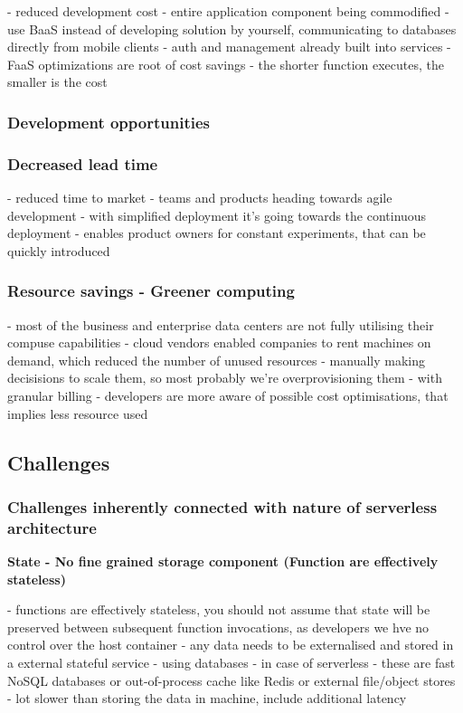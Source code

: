 - reduced development cost - entire application component being commodified - use BaaS instead of developing solution by yourself, communicating to databases directly from mobile clients - auth and management already built into services
- FaaS optimizations are root of cost savings - the shorter function executes, the smaller is the cost

\subsubsection*{Development opportunities} 

\subsubsection*{Decreased lead time} 

- reduced time to market - teams and products heading towards agile development - with simplified deployment it's going towards the continuous deployment
- enables product owners for constant experiments, that can be quickly introduced

\subsubsection*{Resource savings - Greener computing} 

- most of the business and enterprise data centers are not fully utilising their compuse capabilities
- cloud vendors enabled companies to rent machines on demand, which reduced the number of unused resources - manually making decisisions to scale them, so most probably we're overprovisioning them
- with granular billing - developers are more aware of possible cost optimisations, that implies less resource used

\subsection{Challenges} 

\subsubsection*{Challenges inherently connected with nature of serverless architecture} 

\textbf{State - No fine grained storage component (Function are effectively stateless)} 

- functions are effectively stateless, you should not assume that state will be preserved between subsequent function invocations, as developers we hve no control over the host container - any data needs to be externalised and stored in a external stateful service
- using databases - in case of serverless - these are fast NoSQL databases or out-of-process cache like Redis or external file/object stores - lot slower than storing the data in machine, include additional latency

